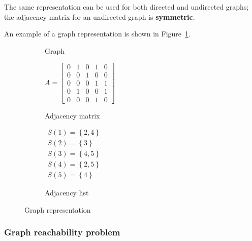 \documentclass[english]{article}
\begin{document}
The same representation can be used for both directed and undirected graphs;
the adjacency matrix for an undirected graph is \textbf{symmetric}.

\bigskip
An example of a graph representation is shown in Figure~\ref{fig:graph-representation}.

\begin{figure}
  \begin{subfigure}{0.33\textwidth}
    \centering
    \caption{Graph}
  \end{subfigure}
  \begin{subfigure}{0.33\textwidth}
    \centering
    \(A = \begin{bmatrix}
      0 & 1 & 0 & 1 & 0 \\
      0 & 0 & 1 & 0 & 0 \\
      0 & 0 & 0 & 1 & 1 \\
      0 & 1 & 0 & 0 & 1 \\
      0 & 0 & 0 & 1 & 0
    \end{bmatrix}\)
    \caption{Adjacency matrix}
  \end{subfigure}
  \begin{subfigure}{0.33\textwidth}
    \centering
    \(\begin{matrix}
      S(1) = \left\{2, 4\right\} \\
      S(2) = \left\{3\right\}    \\
      S(3) = \left\{4, 5\right\} \\
      S(4) = \left\{2, 5\right\} \\
      S(5) = \left\{4\right\}
    \end{matrix}\)
    \caption{Adjacency list}
  \end{subfigure}
  \caption{Graph representation}
  \label{fig:graph-representation}
\end{figure}

\subsubsection{Graph reachability problem}
\end{document}
